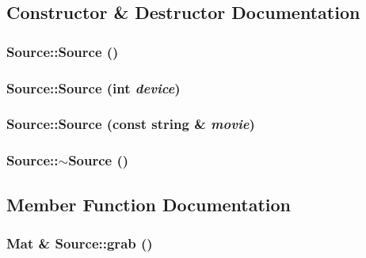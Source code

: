 \subsection{Constructor \& Destructor Documentation}
\hypertarget{class_source_a660c0a4b8b8f8402568bef86f2cb2fbb}{
\subsubsection[{Source}]{\setlength{\rightskip}{0pt plus 5cm}Source::Source ()}}
\label{class_source_a660c0a4b8b8f8402568bef86f2cb2fbb}
\hypertarget{class_source_aefdbc55d88adc315498b669642379eb8}{
\subsubsection[{Source}]{\setlength{\rightskip}{0pt plus 5cm}Source::Source (int {\em device})}}
\label{class_source_aefdbc55d88adc315498b669642379eb8}
\hypertarget{class_source_a5c3bf2e7a9d8d75c334a5d11a29eb058}{
\subsubsection[{Source}]{\setlength{\rightskip}{0pt plus 5cm}Source::Source (const string \& {\em movie})}}
\label{class_source_a5c3bf2e7a9d8d75c334a5d11a29eb058}
\hypertarget{class_source_ac5104a4d66641ae529419b47da4a1473}{
\subsubsection[{$\sim$Source}]{\setlength{\rightskip}{0pt plus 5cm}Source::$\sim$Source ()}}
\label{class_source_ac5104a4d66641ae529419b47da4a1473}


\subsection{Member Function Documentation}
\hypertarget{class_source_a7ca090eb632f1ca7175adeed540fdc26}{
\subsubsection[{grab}]{\setlength{\rightskip}{0pt plus 5cm}Mat \& Source::grab ()}}
\label{class_source_a7ca090eb632f1ca7175adeed540fdc26}


